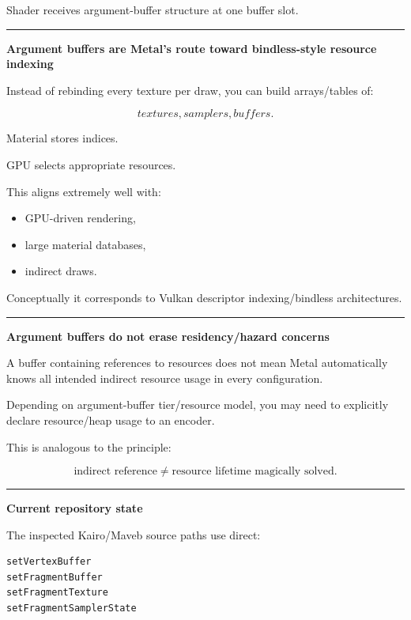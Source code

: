 Shader receives argument-buffer structure at one buffer slot.

\begin{center}\rule{0.5\linewidth}{0.5pt}\end{center}

\textbf{Argument buffers are Metal's route toward bindless-style resource indexing}

Instead of rebinding every texture per draw, you can build arrays/tables of:

\[
textures,
samplers,
buffers.
\]

Material stores indices.

GPU selects appropriate resources.

This aligns extremely well with:

\begin{itemize}
\tightlist
\item
  GPU-driven rendering,
\item
  large material databases,
\item
  indirect draws.
\end{itemize}

Conceptually it corresponds to Vulkan descriptor indexing/bindless architectures.

\begin{center}\rule{0.5\linewidth}{0.5pt}\end{center}

\textbf{Argument buffers do not erase residency/hazard concerns}

A buffer containing references to resources does not mean Metal automatically knows all intended indirect resource usage in every configuration.

Depending on argument-buffer tier/resource model, you may need to explicitly declare resource/heap usage to an encoder.

This is analogous to the principle:

\[
\boxed{
\text{indirect reference}
\neq
\text{resource lifetime magically solved}.
}
\]

\begin{center}\rule{0.5\linewidth}{0.5pt}\end{center}

\textbf{Current repository state}

The inspected Kairo/Maveb source paths use direct:

\begin{verbatim}
setVertexBuffer
setFragmentBuffer
setFragmentTexture
setFragmentSamplerState
\end{verbatim}

